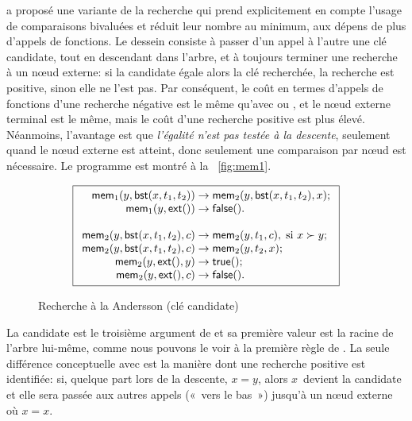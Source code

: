 
\cite{Andersson_1991} a proposé une variante de la recherche qui prend
explicitement en compte l'usage de comparaisons bivaluées et réduit
leur nombre au minimum, aux dépens de plus d'appels de fonctions. Le
dessein consiste à passer d'un appel à l'autre une clé candidate, tout
en descendant dans l'arbre, et à toujours terminer une recherche à un
n{\oe}ud externe: si la candidate égale alors la clé recherchée, la
recherche est positive, sinon elle ne l'est pas. Par conséquent, le
coût en termes d'appels de fonctions d'une recherche négative est le
même qu'avec  ou
, et le n{\oe}ud externe
terminal est le même, mais le coût d'une recherche positive est plus
élevé. Néanmoins, l'avantage est que \emph{l'égalité n'est pas testée
  à la descente}, seulement quand le n{\oe}ud externe est atteint,
donc seulement une comparaison par n{\oe}ud est nécessaire. Le
programme est montré à la \fig~\vref{fig:mem1}.
\begin{figure}
\begin{equation*}
\boxed{
\begin{array}{r@{\;}l@{\;}l}
\fun{mem}_1(y,\fun{bst}(x,t_1,t_2)) & \rightarrow &
  \fun{mem}_2(y,\fun{bst}(x,t_1,t_2),x);\\
\fun{mem}_1(y,\fun{ext}()) & \rightarrow & \fun{false}().\\
\\
\fun{mem}_2(y,\fun{bst}(x,t_1,t_2),c) & \rightarrow &
  \fun{mem}_2(y,t_1,c),\; \text{si \(x \succ y\)};\\
\fun{mem}_2(y,\fun{bst}(x,t_1,t_2),c) & \rightarrow &
  \fun{mem}_2(y,t_2,x);\\
\fun{mem}_2(y,\fun{ext}(),y) & \rightarrow & \fun{true}();\\
\fun{mem}_2(y,\fun{ext}(),c) & \rightarrow & \fun{false}().
\end{array}}
\end{equation*}
\caption{Recherche à la Andersson (clé candidate)}
\label{fig:mem1}
\end{figure}
La candidate est le troisième argument de
 et sa première valeur
est la racine de l'arbre lui-même, comme nous pouvons le voir à la
première règle de . La
seule différence conceptuelle avec
 est la manière dont
une recherche positive est identifiée: si, quelque part lors de la
descente, \(x = y \), alors \(x\)~devient la candidate et elle sera
passée aux autres appels («~vers le bas~») jusqu'à un n{\oe}ud externe
où \(x = x\).

